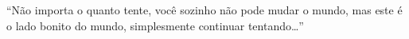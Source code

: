 ``Não importa o quanto tente, você sozinho não pode mudar o mundo, mas este é o lado bonito do mundo, simplesmente continuar tentando\ldots''


